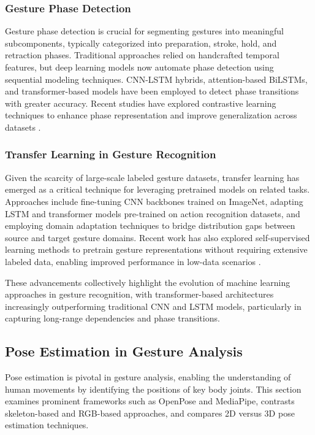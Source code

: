 \subsubsection{Gesture Phase Detection}
Gesture phase detection is crucial for segmenting gestures into meaningful subcomponents, typically categorized into preparation, stroke, hold, and retraction phases. Traditional approaches relied on handcrafted temporal features, but deep learning models now automate phase detection using sequential modeling techniques. CNN-LSTM hybrids, attention-based BiLSTMs, and transformer-based models have been employed to detect phase transitions with greater accuracy. Recent studies have explored contrastive learning techniques to enhance phase representation and improve generalization across datasets \cite{lin2024attention}.

\subsubsection{Transfer Learning in Gesture Recognition}
Given the scarcity of large-scale labeled gesture datasets, transfer learning has emerged as a critical technique for leveraging pretrained models on related tasks. Approaches include fine-tuning CNN backbones trained on ImageNet, adapting LSTM and transformer models pre-trained on action recognition datasets, and employing domain adaptation techniques to bridge distribution gaps between source and target gesture domains. Recent work has also explored self-supervised learning methods to pretrain gesture representations without requiring extensive labeled data, enabling improved performance in low-data scenarios \cite{chen2020cnn}.

These advancements collectively highlight the evolution of machine learning approaches in gesture recognition, with transformer-based architectures increasingly outperforming traditional CNN and LSTM models, particularly in capturing long-range dependencies and phase transitions.

\subsection{Pose Estimation in Gesture Analysis}\label{subsec:pose}

Pose estimation is pivotal in gesture analysis, enabling the understanding of human movements by identifying the positions of key body joints. This section examines prominent frameworks such as OpenPose and MediaPipe, contrasts skeleton-based and RGB-based approaches, and compares 2D versus 3D pose estimation techniques.

